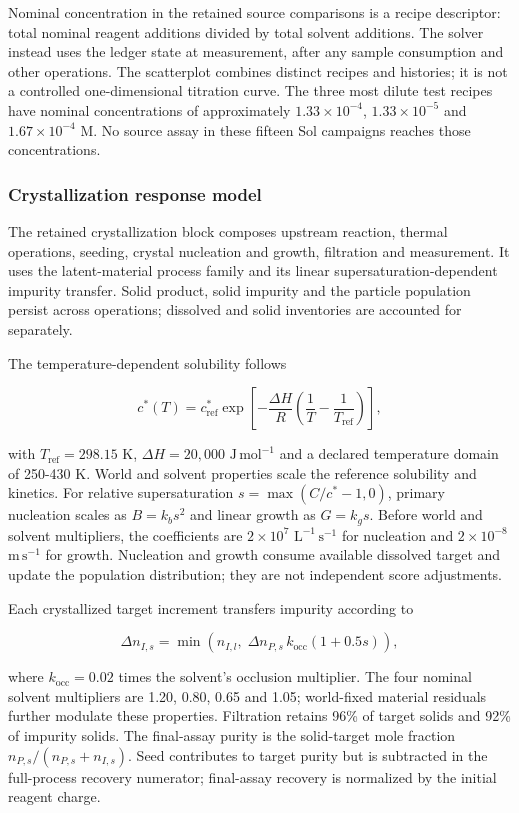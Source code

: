 \documentclass[10pt,a4paper]{article}
\begin{document}
Nominal concentration in the retained source comparisons is a recipe descriptor: total nominal reagent additions divided by total solvent additions. The solver instead uses the ledger state at measurement, after any sample consumption and other operations. The scatterplot combines distinct recipes and histories; it is not a controlled one-dimensional titration curve. The three most dilute test recipes have nominal concentrations of approximately \(1.33\times10^{-4}\), \(1.33\times10^{-5}\) and \(1.67\times10^{-4}\) M. No source assay in these fifteen Sol campaigns reaches those concentrations.

\subsubsection{Crystallization response model}\label{crystallization-response-model}

The retained crystallization block composes upstream reaction, thermal operations, seeding, crystal nucleation and growth, filtration and measurement. It uses the latent-material process family and its linear supersaturation-dependent impurity transfer. Solid product, solid impurity and the particle population persist across operations; dissolved and solid inventories are accounted for separately.

The temperature-dependent solubility follows

\[c^*(T)=c^*_{\mathrm{ref}}\exp\!\left[-\frac{\Delta H}{R}\left(\frac{1}{T}-\frac{1}{T_{\mathrm{ref}}}\right)\right],\]

with \(T_{\mathrm{ref}}=298.15\) K, \(\Delta H=20{,}000\) \(\mathrm{J\,mol^{-1}}\) and a declared temperature domain of 250-430 K. World and solvent properties scale the reference solubility and kinetics. For relative supersaturation \(s=\max(C/c^*-1,0)\), primary nucleation scales as \(B=k_b s^2\) and linear growth as \(G=k_g s\). Before world and solvent multipliers, the coefficients are \(2\times10^7\) \(\mathrm{L^{-1}\,s^{-1}}\) for nucleation and \(2\times10^{-8}\) \(\mathrm{m\,s^{-1}}\) for growth. Nucleation and growth consume available dissolved target and update the population distribution; they are not independent score adjustments.

Each crystallized target increment transfers impurity according to

\[\Delta n_{I,s}=\min\!\left(n_{I,l},\;\Delta n_{P,s}\,k_{\mathrm{occ}}(1+0.5s)\right),\]

where \(k_{\mathrm{occ}}=0.02\) times the solvent's occlusion multiplier. The four nominal solvent multipliers are 1.20, 0.80, 0.65 and 1.05; world-fixed material residuals further modulate these properties. Filtration retains 96\% of target solids and 92\% of impurity solids. The final-assay purity is the solid-target mole fraction \(n_{P,s}/(n_{P,s}+n_{I,s})\). Seed contributes to target purity but is subtracted in the full-process recovery numerator; final-assay recovery is normalized by the initial reagent charge.
\end{document}
